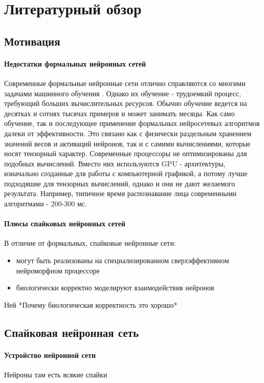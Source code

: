 \documentclass[a4paper]{article}
\begin{document}
\section{Литературный обзор}

\subsection{Мотивация}
\paragraph{Недостатки формальных нейронных сетей}
Современные формальные нейронные сети отлично справляются со многими задачами машинного обучения \cite{pmlr-v28-wan13}. Однако их обучение - трудоемкий процесс, требующий больших вычислительных ресурсов. Обычно обучение ведется на десятках и сотнях тысячах примеров и может занимать месяцы. Как само обучение, так и последующее применение формальных нейросетевых алгоритмов далеки от эффективности. Это связано как с физически раздельным хранением значений весов и активаций нейронов, так и с самими вычислениями, которые носят тензорный характер. Современные процессоры не оптимизированы для подобных вычислений. Вместо них используются GPU - архитектуры, изначально созданные для работы с компьютерной графикой, а потому лучше подходяшие для тензорных вычислений, однако и они не дают желаемого результата. Например, типичное время распознавание лица современными алгоритмами - 200-300 мс.

\paragraph{Плюсы спайковых нейронных сетей}
В отличие от формальных, спайковые нейронные сети:

\begin{itemize}
 \item могут быть реализованы на специализированном сверхэффективном нейроморфном процессоре
 \item биологически корректно моделируют взаимодействия нейронов
\end{itemize}

Ней
*Почему биологическая корректность это хорошо*


\subsection{Спайковая нейронная сеть}
\paragraph{Устройство нейронной сети}
Нейроны там есть всякие спайки
\end{document}
